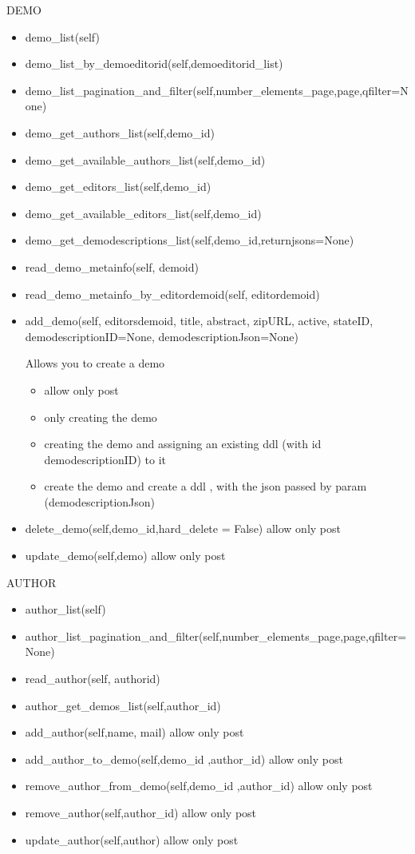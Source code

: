 DEMO

\begin{itemize}
\item  demo\_list(self)
\item  demo\_list\_by\_demoeditorid(self,demoeditorid\_list)
\item  demo\_list\_pagination\_and\_filter(self,number\_elements\_page,page,qfilter=None)
\item  demo\_get\_authors\_list(self,demo\_id)
\item  demo\_get\_available\_authors\_list(self,demo\_id)
\item  demo\_get\_editors\_list(self,demo\_id)
\item  demo\_get\_available\_editors\_list(self,demo\_id)
\item  demo\_get\_demodescriptions\_list(self,demo\_id,returnjsons=None)
\item  read\_demo\_metainfo(self, demoid)
\item  read\_demo\_metainfo\_by\_editordemoid(self, editordemoid)
\item  add\_demo(self, editorsdemoid, title, abstract, zipURL, active, stateID, demodescriptionID=None, demodescriptionJson=None)

    Allows you to create a demo
    \begin{itemize}
        \item allow only post
        \item only creating the demo
        \item creating the demo and assigning an existing ddl (with id demodescriptionID) to it
        \item create the demo and create a ddl , with the json passed by param (demodescriptionJson)
    \end{itemize}

\item  delete\_demo(self,demo\_id,hard\_delete = False)
allow only post
\item  update\_demo(self,demo)
allow only post
\end{itemize}


AUTHOR

\begin{itemize}
\item  author\_list(self)
\item  author\_list\_pagination\_and\_filter(self,number\_elements\_page,page,qfilter=None)
\item  read\_author(self, authorid)
\item  author\_get\_demos\_list(self,author\_id)
\item  add\_author(self,name, mail)
allow only post
\item  add\_author\_to\_demo(self,demo\_id ,author\_id)
allow only post
\item  remove\_author\_from\_demo(self,demo\_id ,author\_id)
allow only post
\item  remove\_author(self,author\_id)
allow only post
\item  update\_author(self,author)
allow only post
\end{itemize}


